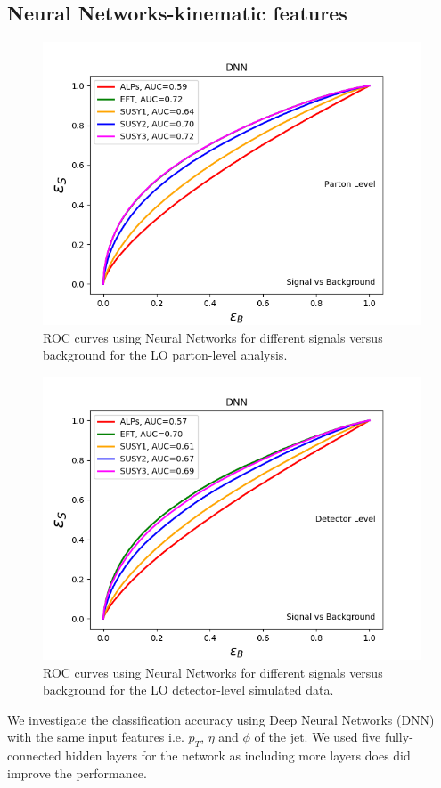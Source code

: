 \documentclass[prd,aps,letterpaper,floatfix,superscriptaddress,preprintnumbers,twocolumn,10pt,nofootinbib]{revtex4-1}
\begin{document}
\subsection{Neural Networks-kinematic features}
\begin{figure}%
\centering
\includegraphics[scale=0.50]{figures/ROCsbNN.png}
\caption{ROC curves using Neural Networks   for different signals versus background for the LO parton-level analysis. 
}\label{rocLO-NN}
\end{figure}
\begin{figure}%
\centering
\includegraphics[scale=0.50]{figures/ROCsbNNdelphes.png}
\caption{ROC curves using Neural Networks for different signals versus background for the LO detector-level simulated data. 
 }\label{roc-LOdelphes-NN}
\end{figure}
We investigate the classification accuracy using Deep Neural Networks (DNN) with the same input features
i.e. $p_T$, $\eta$ and $\phi$ of the jet. We used five fully-connected hidden layers for the network as including more layers
does did improve the performance. 
\end{document}
